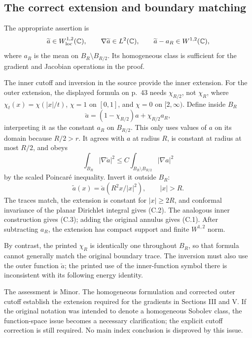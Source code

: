 \documentclass[10pt]{article}
\begin{document}
\subsection*{The correct extension and boundary matching}
The appropriate assertion is \[\widetilde a\in W^{1,2}_{\rm loc}(\mathbb C),\qquad
 \nabla\widetilde a\in L^2(\mathbb C),
 \qquad
 \widetilde a-a_R\in W^{1,2}(\mathbb C),\] where \(a_R\) is the mean on \(B_R\setminus B_{R/2}\). Its homogeneous class is sufficient for the gradient and Jacobian operations in the proof.\par
The inner cutoff and inversion in the source provide the inner extension. For the outer extension, the displayed formula on p. 43 needs \(\chi_{R/2}\), not \(\chi_R\), where \(\chi_t(x)=\chi(|x|/t)\), \(\chi=1\) on \([0,1]\), and \(\chi=0\) on \([2,\infty)\). Define inside \(B_R\) \[\breve a=(1-\chi_{R/2})a+\chi_{R/2}a_R,\] interpreting it as the constant \(a_R\) on \(B_{R/2}\). This only uses values of \(a\) on its domain because \(R/2>r\). It agrees with \(a\) at radius \(R\), is constant at radius at most \(R/2\), and obeys \[\int_{B_R}|\nabla\breve a|^2
 \le C\int_{B_R\setminus B_{R/2}}|\nabla a|^2\] by the scaled Poincaré inequality. Invert it outside \(B_R\): \[\widetilde a(x)=\breve a\left(R^2x/|x|^2\right),\qquad |x|>R.\] The traces match, the extension is constant for \(|x|\ge2R\), and conformal invariance of the planar Dirichlet integral gives (C.2). The analogous inner construction gives (C.3); adding the original annulus gives (C.1). After subtracting \(a_R\), the extension has compact support and finite \(W^{1,2}\) norm.\par
By contrast, the printed \(\chi_R\) is identically one throughout \(B_R\), so that formula cannot generally match the original boundary trace. The inversion must also use the outer function \(\breve a\); the printed use of the inner-function symbol there is inconsistent with its following energy identity.\par
The assessment is Minor. The homogeneous formulation and corrected outer cutoff establish the extension required for the gradients in Sections III and V. If the original notation was intended to denote a homogeneous Sobolev class, the function-space issue becomes a necessary clarification; the explicit cutoff correction is still required. No main index conclusion is disproved by this issue.\par
\end{document}
